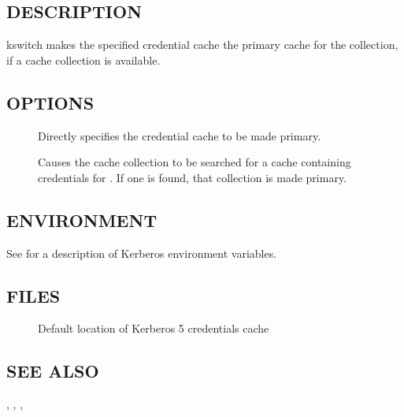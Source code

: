 \documentclass[letterpaper,10pt,english]{sphinxmanual}
\begin{document}
\subsection{DESCRIPTION}
\label{\detokenize{user/user_commands/kswitch:description}}
\sphinxAtStartPar
kswitch makes the specified credential cache the primary cache for the
collection, if a cache collection is available.


\subsection{OPTIONS}
\label{\detokenize{user/user_commands/kswitch:options}}\begin{description}
\item[{ }] \leavevmode
\sphinxAtStartPar
Directly specifies the credential cache to be made primary.

\item[{ }] \leavevmode
\sphinxAtStartPar
Causes the cache collection to be searched for a cache containing
credentials for .  If one is found, that collection is
made primary.

\end{description}


\subsection{ENVIRONMENT}
\label{\detokenize{user/user_commands/kswitch:environment}}
\sphinxAtStartPar
See {\hyperref[\detokenize{user/user_config/kerberos:kerberos-7}]{}} for a description of Kerberos environment
variables.


\subsection{FILES}
\label{\detokenize{user/user_commands/kswitch:files}}\begin{description}
\item[{}] \leavevmode
\sphinxAtStartPar
Default location of Kerberos 5 credentials cache

\end{description}


\subsection{SEE ALSO}
\label{\detokenize{user/user_commands/kswitch:see-also}}
\sphinxAtStartPar
{\hyperref[\detokenize{user/user_commands/kinit:kinit-1}]{}}, {\hyperref[\detokenize{user/user_commands/kdestroy:kdestroy-1}]{}}, {\hyperref[\detokenize{user/user_commands/klist:klist-1}]{}},
{\hyperref[\detokenize{user/user_config/kerberos:kerberos-7}]{}}
\end{document}
